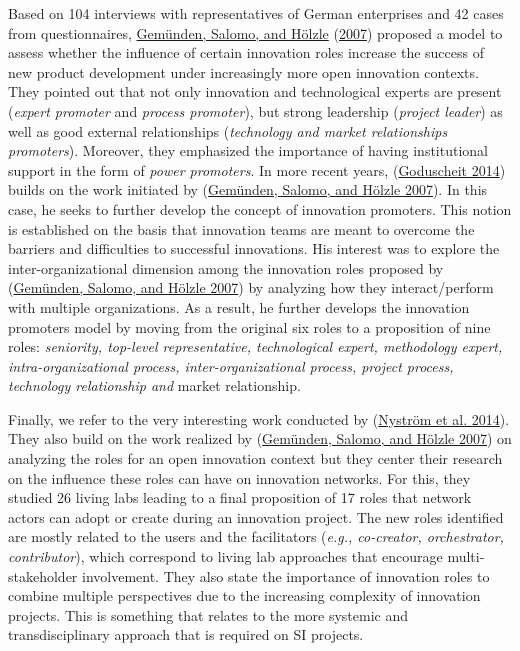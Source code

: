 \documentclass[AMA,STIX1COL,APA,STIX2COL]{WileyNJD-v2}
\begin{document}
Based on 104 interviews with representatives of German enterprises and
42 cases from questionnaires,
\protect\hyperlink{ref-Gemunden2007}{Gemünden, Salomo, and Hölzle}
(\protect\hyperlink{ref-Gemunden2007}{2007}) proposed a model to assess
whether the influence of certain innovation roles increase the success
of new product development under increasingly more open innovation
contexts. They pointed out that not only innovation and technological
experts are present (\emph{expert promoter} and \emph{process
promoter}), but strong leadership (\emph{project leader}) as well as
good external relationships (\emph{technology and market relationships
promoters}). Moreover, they emphasized the importance of having
institutional support in the form of \emph{power promoters}. In more
recent years, (\protect\hyperlink{ref-Goduscheit2014}{Goduscheit 2014})
builds on the work initiated by
(\protect\hyperlink{ref-Gemunden2007}{Gemünden, Salomo, and Hölzle
2007}). In this case, he seeks to further develop the concept of
innovation promoters. This notion is established on the basis that
innovation teams are meant to overcome the barriers and difficulties to
successful innovations. His interest was to explore the
inter-organizational dimension among the innovation roles proposed by
(\protect\hyperlink{ref-Gemunden2007}{Gemünden, Salomo, and Hölzle
2007}) by analyzing how they interact/perform with multiple
organizations. As a result, he further develops the innovation promoters
model by moving from the original six roles to a proposition of nine
roles: \emph{seniority, top-level representative, technological expert,
methodology expert, intra-organizational process, inter-organizational
process, project process, technology relationship and} market
relationship.

Finally, we refer to the very interesting work conducted by
(\protect\hyperlink{ref-Nystrom2014}{Nyström et al. 2014}). They also
build on the work realized by
(\protect\hyperlink{ref-Gemunden2007}{Gemünden, Salomo, and Hölzle
2007}) on analyzing the roles for an open innovation context but they
center their research on the influence these roles can have on
innovation networks. For this, they studied 26 living labs leading to a
final proposition of 17 roles that network actors can adopt or create
during an innovation project. The new roles identified are mostly
related to the users and the facilitators (\emph{e.g., co-creator,
orchestrator, contributor}), which correspond to living lab approaches
that encourage multi-stakeholder involvement. They also state the
importance of innovation roles to combine multiple perspectives due to
the increasing complexity of innovation projects. This is something that
relates to the more systemic and transdisciplinary approach that is
required on SI projects.
\end{document}
